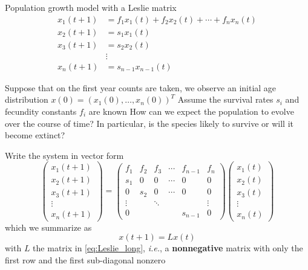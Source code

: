 \documentclass{beamer}
\def\ie{\emph{i.e.}}
\def\defword#1{\textbf{#1}}
\begin{document}
\begin{frame}{Population growth model with a Leslie matrix}
\begin{align*}
 x_1(t+1) &= f_1x_1(t)+f_2x_2(t)+\cdots+f_nx_n(t) \\
 x_2(t+1) &= s_1x_1(t) \\
 x_3(t+1) &= s_2x_2(t) \\
 &\vdots \\
 x_n(t+1) &= s_{n-1}x_{n-1}(t)
\end{align*}
\end{frame}

\begin{frame}
Suppose that on the first year counts are taken, we observe an initial age distribution $x(0)=(x_1(0),\ldots,x_n(0))^T$
\vfill
Assume the survival rates $s_i$ and fecundity constants $f_i$ are known
\vfill
How can we expect the population to evolve over the course of time? In particular, is the species likely to survive or will it become extinct?
\end{frame}

\begin{frame}
Write the system in vector form
\begin{equation}\label{eq:Leslie_long}
\begin{pmatrix}
x_1(t+1) \\ x_2(t+1) \\ x_3(t+1) \\ \vdots \\ x_n(t+1)
\end{pmatrix}
=
\begin{pmatrix}
f_1 & f_2 & f_3 & \cdots & f_{n-1} & f_n \\
s_1 & 0 & 0 & \cdots & 0 & 0 \\
0 & s_2 & 0 & \cdots & 0 & 0 \\
\vdots && \ddots &&& \vdots \\
0 &&&&s_{n-1} & 0
\end{pmatrix}
\begin{pmatrix}
x_1(t) \\ x_2(t) \\ x_3(t) \\ \vdots \\ x_n(t)
\end{pmatrix}
\end{equation}
which we summarize as
\begin{equation}\label{eq:Leslie_short}
x(t+1)=Lx(t)
\end{equation}
with $L$ the matrix in \eqref{eq:Leslie_long}, \ie, a \defword{nonnegative} matrix with only the first row and the first sub-diagonal nonzero
\end{frame}
\end{document}
